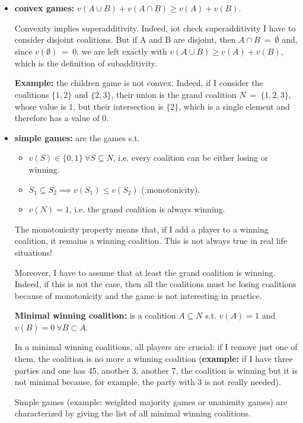 \begin{itemize}
	\item \textbf{convex games:} $v(A \cup B) + v(A \cap B) \geq v(A) + v(B)$.
	
	\noindent Convexity implies superadditivity. Indeed, iot check superadditivity I 
	have to consider disjoint coalitions. But if A and B are disjoint, then 
	$A \cap B~=~\emptyset$ and, since $v(\emptyset)~=~0$, we are left exactly 
	with $v(A\cup B) \geq v(A)+v(B)$, which is the definition of subadditivity.
	
	\noindent \textbf{Example:} the children game is not convex. Indeed, if I 
	consider the coalitions $\{1,2\}$ and $\{2,3\}$, their union is the grand 
	coalition $N~=~\{1,2,3\}$, whose value is 1, but their intersection is $\{2\}$, 
	which is a single element and therefore has a value of 0.
	
	\item \textbf{simple games:} are the games s.t.
	\begin{itemize}
		\item $v(S) \in \{0,1\} ~\forall S \subseteq N$, i.e. every coalition can be either losing or winning.
		\item $S_1 \subseteq S_2 \implies v(S_1) \leq v(S_2)$ (:monotonicity).
		\item $v(N) = 1$, i.e. the grand coalition is always winning.
	\end{itemize}

	\noindent The monotonicity property means that, if I add a player to a winning coalition, it remains a winning 
	coalition. This is not always true in real life situations!
	
	\noindent Moreover, I have to assume that at least the grand coalition is 
	winning. Indeed, if this is not the case, then all the coalitions must be
	losing coalitions because of monotonicity and the game is not interesting 
	in practice.
	
	\noindent \textbf{Minimal winning coalition:} is a coalition $A \subseteq N$ s.t. $v(A) = 1$ and $v(B) = 0 ~\forall B \subset A$.
	
	\noindent In a minimal winning coalitions, all players are crucial: if I 
	remove just one of them, the coalition is no more a winning coalition 
	(\textbf{example:} if I have three parties and one has 45, another 3, 
	another 7, the coalition is winning but it is not minimal because, for example, 
	the party with 3 is not really needed).
	
	\noindent Simple games (example: weighted majority games or unanimity games) are characterized by giving the list of all minimal 
	winning coalitions.
\end{itemize}


